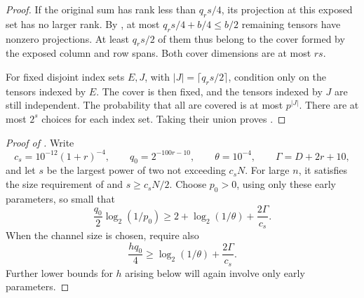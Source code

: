 \begin{proof}
If the original sum has rank less than \(q_rs/4\), its projection
at this exposed set has no larger rank.  By
, at most
\(q_rs/4+b/4\le b/2\) remaining tensors have nonzero projections.
At least \(q_rs/2\) of them thus belong to the cover formed by the
exposed column and row spans.  Both cover dimensions are at most
\(rs\).

For fixed disjoint index sets \(E,J\), with
\(|J|=\lceil q_rs/2\rceil\), condition only on the tensors indexed
by \(E\).  The cover is then fixed, and the tensors indexed by \(J\)
are still independent.  The probability that all are covered is
at most \(p^{|J|}\).  There are at most \(2^s\) choices for each
index set.  Taking their union proves .
\end{proof}

\begin{proof}[Proof of ]
Write
\[
 c_s=10^{-12}(1+r)^{-4},\qquad q_0=2^{-100r-10},
 \qquad \theta=10^{-4},\qquad \Gamma=D+2r+10,
\]
and let \(s\) be the largest power of two not exceeding \(c_sN\).
For large \(n\), it satisfies the size requirement of
 and \(s\ge c_sN/2\).
Choose \(p_0>0\), using only these early parameters, so small that
\begin{equation}
 \frac{q_0}{2}\log_2(1/p_0)
 \ge 2+\log_2(1/\theta)+\frac{2\Gamma}{c_s}.
 \label{eq:early-p0}
\end{equation}
When the channel size is chosen, require also
\begin{equation}
 \frac{hq_0}{4}
 \ge \log_2(1/\theta)+\frac{2\Gamma}{c_s}.
 \label{eq:early-h-moment}
\end{equation}
Further lower bounds for \(h\) arising below will again involve
only early parameters.


\end{proof}
